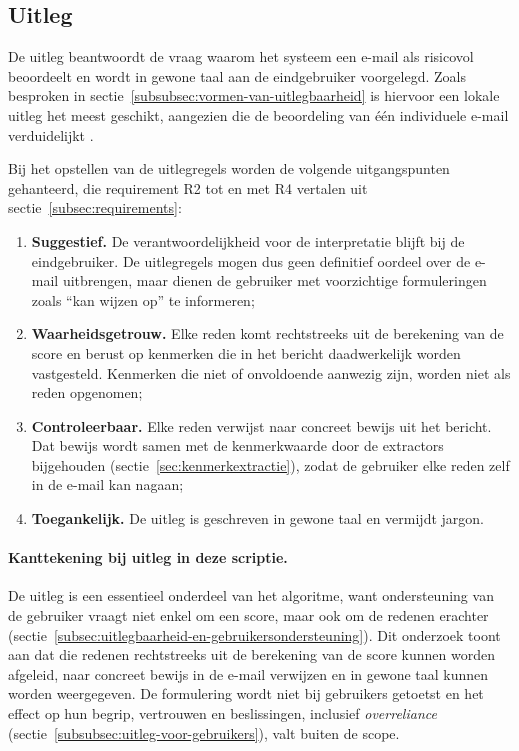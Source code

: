 \subsection{Uitleg}
\label{subsec:uitleg}

De uitleg beantwoordt de vraag waarom het systeem een e-mail als risicovol beoordeelt en wordt in gewone taal aan de eindgebruiker voorgelegd. Zoals besproken in sectie~\ref{subsubsec:vormen-van-uitlegbaarheid} is hiervoor een lokale uitleg het meest geschikt, aangezien die de beoordeling van één individuele e-mail verduidelijkt \autocite{Guidotti2018}.

Bij het opstellen van de uitlegregels worden de volgende uitgangspunten gehanteerd, die requirement R2 tot en met R4 vertalen uit sectie~\ref{subsec:requirements}:
\begin{enumerate}
    \item \textbf{Suggestief.} De verantwoordelijkheid voor de interpretatie blijft bij de eindgebruiker. De uitlegregels mogen dus geen definitief oordeel over de e-mail uitbrengen, maar dienen de gebruiker met voorzichtige formuleringen zoals ``kan wijzen op'' te informeren;
    \item \textbf{Waarheidsgetrouw.} Elke reden komt rechtstreeks uit de berekening van de score en berust op kenmerken die in het bericht daadwerkelijk worden vastgesteld. Kenmerken die niet of onvoldoende aanwezig zijn, worden niet als reden opgenomen;
    \item \textbf{Controleerbaar.} Elke reden verwijst naar concreet bewijs uit het bericht. Dat bewijs wordt samen met de kenmerkwaarde door de extractors bijgehouden (sectie~\ref{sec:kenmerkextractie}), zodat de gebruiker elke reden zelf in de e-mail kan nagaan;
     \item \textbf{Toegankelijk.} De uitleg is geschreven in gewone taal en vermijdt jargon.
\end{enumerate}

\paragraph{Kanttekening bij uitleg in deze scriptie.}
De uitleg is een essentieel onderdeel van het algoritme, want ondersteuning van de gebruiker vraagt niet enkel om een score, maar ook om de redenen erachter (sectie~\ref{subsec:uitlegbaarheid-en-gebruikersondersteuning}). Dit onderzoek toont aan dat die redenen rechtstreeks uit de berekening van de score kunnen worden afgeleid, naar concreet bewijs in de e-mail verwijzen en in gewone taal kunnen worden weergegeven. De formulering wordt niet bij gebruikers getoetst en het effect op hun begrip, vertrouwen en beslissingen, inclusief \emph{overreliance} (sectie~\ref{subsubsec:uitleg-voor-gebruikers}), valt buiten de scope.